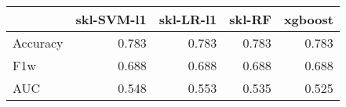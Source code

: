 \begin{tabular}{lrrrr}
\toprule
{} &  skl-SVM-l1 &  skl-LR-l1 &  skl-RF &  xgboost \\
\midrule
Accuracy &       0.783 &      0.783 &   0.783 &    0.783 \\
F1w      &       0.688 &      0.688 &   0.688 &    0.688 \\
AUC      &       0.548 &      0.553 &   0.535 &    0.525 \\
\bottomrule
\end{tabular}

